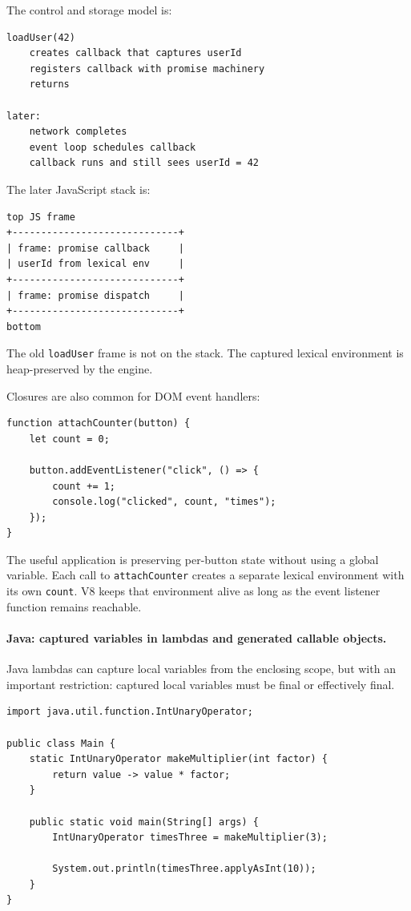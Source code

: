 The control and storage model is:

\begin{verbatim}
loadUser(42)
    creates callback that captures userId
    registers callback with promise machinery
    returns

later:
    network completes
    event loop schedules callback
    callback runs and still sees userId = 42
\end{verbatim}

The later JavaScript stack is:

\begin{verbatim}
top JS frame
+-----------------------------+
| frame: promise callback     |
| userId from lexical env     |
+-----------------------------+
| frame: promise dispatch     |
+-----------------------------+
bottom
\end{verbatim}

The old \texttt{loadUser} frame is not on the stack. The captured lexical environment is heap-preserved by the engine.

Closures are also common for DOM event handlers:

\begin{verbatim}
function attachCounter(button) {
    let count = 0;

    button.addEventListener("click", () => {
        count += 1;
        console.log("clicked", count, "times");
    });
}
\end{verbatim}

The useful application is preserving per-button state without using a global variable. Each call to \texttt{attachCounter} creates a separate lexical environment with its own \texttt{count}. V8 keeps that environment alive as long as the event listener function remains reachable.

\paragraph{Java: captured variables in lambdas and generated callable objects.}

Java lambdas can capture local variables from the enclosing scope, but with an important restriction: captured local variables must be final or effectively final.

\begin{verbatim}
import java.util.function.IntUnaryOperator;

public class Main {
    static IntUnaryOperator makeMultiplier(int factor) {
        return value -> value * factor;
    }

    public static void main(String[] args) {
        IntUnaryOperator timesThree = makeMultiplier(3);

        System.out.println(timesThree.applyAsInt(10));
    }
}
\end{verbatim}

